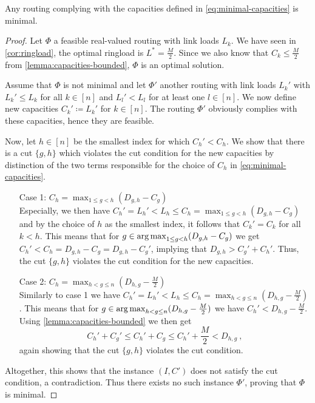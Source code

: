 \begin{theorem}
	\label{theo:routing-with-capacities-is-minimal}
	Any routing complying with the capacities defined in \cref{eq:minimal-capacities} is minimal.
\end{theorem}
\begin{proof}	
	Let $\Phi$ a feasible real-valued routing with link loads $L_k$.
	We have seen in \cref{cor:ringload}, the optimal ringload is $L^\ast = \frac{M}{2}$.
	Since we also know that $C_k \leq \frac{M}{2}$ from \cref{lemma:capacities-bounded}, $\Phi$ is an optimal solution.
	
	Assume that $\Phi$ is not minimal and let $\Phi'$ another routing with link loads $L_k'$ with $L_k' \leq L_k$ for all $k \in [n]$ and $L_l' < L_l$ for at least one $l \in [n]$.
	We now define new capacities $C_k' \coloneqq L_k'$ for $k \in [n]$.
	The routing $\Phi'$ obviously complies with these capacities, hence they are feasible.
	
	Now, let $h \in [n]$ be the smallest index for which $C_h' < C_h$.
	We show that there is a cut $\{g, h\}$ which violates the cut condition for the new capacities by distinction of the two terms responsible for the choice of $C_h$ in \cref{eq:minimal-capacities}.
	\begin{enumerate}[align=left]
		\item[Case 1: $C_h = \max_{1 \leq g < h}(D_{g,h} - C_g)$]{\mbox{}\\
			Especially, we then have $C_h'= L_h' < L_h \leq C_h = \max_{1 \leq g < h}(D_{g, h} - C_g)$ and by the choice of $h$ as the smallest index, it follows that $C_k' = C_k$ for all $k < h$.
			This means that for $g \in \operatorname*{arg\,max}_{1 \leq g < h}(D_{g, h} - C_g)$ we get $C_h' < C_h = D_{g, h} - C_g = D_{g, h} - C_g'$, implying that $D_{g, h} > C_g' + C_h'$.
			Thus, the cut $\{g, h\}$ violates the cut condition for the new capacities.
		}
		\item[Case 2: $C_h = \max_{h < g \leq n}(D_{h, g} - \frac{M}{2})$]{\mbox{}\\
			Similarly to case 1 we have $C_h'= L_h' < L_h \leq C_h = \max_{h < g \leq n}(D_{h,g} - \frac{M}{2})$.
			This means that for $g \in \operatorname*{arg\,max}_{h < g \leq n}(D_{h,g} - \frac{M}{2})$ we have $C_h' < D_{h,g} - \frac{M}{2}$.
			Using \cref{lemma:capacities-bounded} we then get 
			\begin{equation}
				C_h' + C_g' \leq C_h' + C_g \leq C_h' + \frac{M}{2} < D_{h, g} \ ,
			\end{equation}
			again showing that the cut $\{g, h\}$ violates the cut condition.
		}
	\end{enumerate}
	Altogether, this shows that the instance $(I, C')$ does not satisfy the cut condition, a contradiction.
	Thus there exists no such instance $\Phi'$, proving that $\Phi$ is minimal.
\end{proof}

